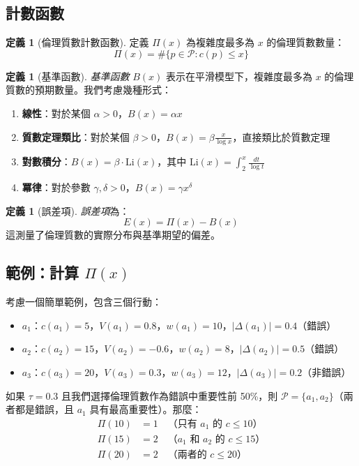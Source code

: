 \documentclass[12pt,a4paper]{article}
\theoremstyle{definition}
\newtheorem{definition}[theorem]{定義}
\theoremstyle{remark}
\begin{document}
\subsection{計數函數}

\begin{definition}[倫理質數計數函數]
定義 $\Pi(x)$ 為複雜度最多為 $x$ 的倫理質數數量：
\[
\Pi(x) = \#\{p \in \mathcal{P} : c(p) \leq x\}
\]
\end{definition}

\begin{definition}[基準函數]
\emph{基準函數} $B(x)$ 表示在平滑模型下，複雜度最多為 $x$ 的倫理質數的預期數量。我們考慮幾種形式：
\begin{enumerate}
    \item \textbf{線性}：對於某個 $\alpha > 0$，$B(x) = \alpha x$
    \item \textbf{質數定理類比}：對於某個 $\beta > 0$，$B(x) = \beta \frac{x}{\log x}$，直接類比於質數定理
    \item \textbf{對數積分}：$B(x) = \beta \cdot \text{Li}(x)$，其中 $\text{Li}(x) = \int_2^x \frac{dt}{\log t}$
    \item \textbf{冪律}：對於參數 $\gamma, \delta > 0$，$B(x) = \gamma x^\delta$
\end{enumerate}
\end{definition}

\begin{definition}[誤差項]
\emph{誤差項}為：
\[
E(x) = \Pi(x) - B(x)
\]
這測量了倫理質數的實際分布與基準期望的偏差。
\end{definition}

\subsection{範例：計算 $\Pi(x)$}

考慮一個簡單範例，包含三個行動：
\begin{itemize}
    \item $a_1$：$c(a_1) = 5$，$V(a_1) = 0.8$，$w(a_1) = 10$，$|\Delta(a_1)| = 0.4$（錯誤）
    \item $a_2$：$c(a_2) = 15$，$V(a_2) = -0.6$，$w(a_2) = 8$，$|\Delta(a_2)| = 0.5$（錯誤）
    \item $a_3$：$c(a_3) = 20$，$V(a_3) = 0.3$，$w(a_3) = 12$，$|\Delta(a_3)| = 0.2$（非錯誤）
\end{itemize}

如果 $\tau = 0.3$ 且我們選擇倫理質數作為錯誤中重要性前 50\%，則 $\mathcal{P} = \{a_1, a_2\}$（兩者都是錯誤，且 $a_1$ 具有最高重要性）。那麼：
\begin{align*}
\Pi(10) &= 1 \quad \text{（只有 $a_1$ 的 $c \leq 10$）} \\
\Pi(15) &= 2 \quad \text{（$a_1$ 和 $a_2$ 的 $c \leq 15$）} \\
\Pi(20) &= 2 \quad \text{（兩者的 $c \leq 20$）}
\end{align*}
\end{document}
